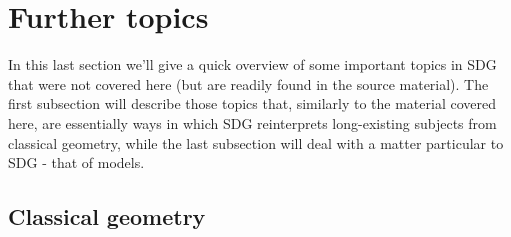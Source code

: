 \chapter{Further topics}

In this last section we'll give a quick overview of some important topics in SDG that were not covered here (but are readily found in the source material). The first subsection will describe those topics that, similarly to the material covered here, are essentially ways in which SDG reinterprets long-existing subjects from classical geometry, while the last subsection will deal with a matter particular to SDG - that of models.

\section{Classical geometry}


